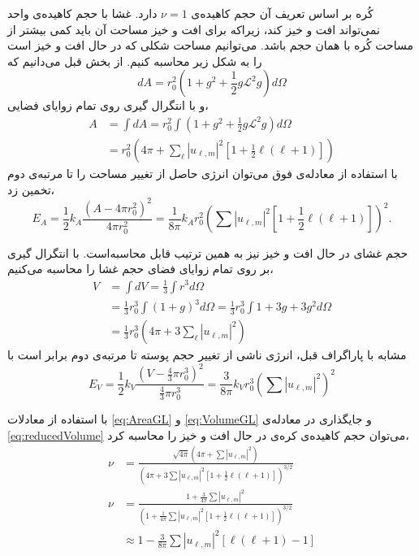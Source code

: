 
 کُره‌ بر اساس تعریف آن حجم کاهیده‌ی 
 $\nu=1$
 دارد. غشا با حجم کاهیده‌ی واحد نمی‌تواند افت و خیز کند، زیراکه برای افت و خیز مساحت آن باید کمی بیشتر از مساحت کُره با همان حجم باشد. می‌توانیم مساحت شکلی که در حال افت و خیز است را به شکل زیر محاسبه کنیم. از بخش قبل می‌دانیم که
\begin{equation}
dA=r_{0}^2(1+g^2+\frac{1}{2}g\mathcal{L}^2g)d\Omega
\label{eq:areaPatchDifferential}
\end{equation}
 و با انتگرال گیری روی تمام زوایای فضایی،
 \begin{equation}
\begin{aligned}
A&=\int dA=r_{0}^2\int(1+g^2+\frac{1}{2}g\mathcal{L}^2g)d\Omega\\
&=r_{0}^2(4\pi+\sum_{\ell}|u_{\ell,m}|^2[1+\frac{1}{2}\ell(\ell+1)])
\label{eq:AreaGL}
\end{aligned}
\end{equation}
با استفاده از معادله‌ی فوق می‌توان انرژی حاصل از تغییر مساحت را تا مرتبه‌ی دوم تخمین زد،
\begin{equation}
E_A=\frac{1}{2}k_A\frac{(A-4\pi r_{0}^2)^2}{4\pi r_{0}^2}=\frac{1}{8\pi}k_A r_{0}^2(\sum|u_{\ell,m}|^2[1+\frac{1}{2}\ell(\ell+1)])^2.
\label{eq:AreaGLFluctuationAmplitude}
\end{equation}


 حجم غشای در حال افت و خیز نیز به همین ترتیب قابل محاسبه‌است. با انتگرال گیری بر روی تمام زوایای فضای حجم غشا را محاسبه می‌کنیم،
\begin{equation}
\begin{aligned}
V&=\int dV=\frac{1}{3}\int r^3d\Omega\\
&=\frac{1}{3}r_{0}^3\int(1+g)^3d\Omega=\frac{1}{3}r_{0}^3\int1+3g+3g^2d\Omega\\
&=\frac{1}{3}r_{0}^3(4\pi+3\sum_{\ell}|u_{\ell,m}|^2)
\label{eq:VolumeGL}
\end{aligned}
\end{equation}
مشابه با پاراگراف قبل، انرژی ناشی از تغییر حجم پوسته تا مرتبه‌ی دوم برابر است با
\begin{equation}
E_V=\frac{1}{2}k_V\frac{(V-\frac{4}{3}\pi r_{0}^3)^2}{\frac{4}{3}\pi r_{0}^3}= \frac{3}{8\pi}k_Vr_{0}^3(\sum|u_{\ell,m}|^2)^2
\label{eq:VolumeGLFluctuationAmplitude}
\end{equation}



با استفاده از معادلات
\ref{eq:AreaGL}
و
\ref{eq:VolumeGL}
و جایگذاری در معادله‌ی
\ref{eq:reducedVolume}
می‌توان حجم کاهیده‌ی کره‌ی در حال افت و خیز  را محاسبه کرد،
\begin{equation}
\begin{aligned}
\nu&=\frac{\sqrt{4\pi}(4\pi+\sum|u_{\ell,m}|^2)}{(4\pi+3\sum|u_{\ell,m}|^2[1+\frac{1}{2}\ell(\ell+1)])^{3/2}}\\
\nu&=\frac{1+\frac{3}{4\pi}\sum|u_{\ell,m}|^2}{(1+\frac{1}{4\pi}\sum|u_{\ell,m}|^2[1+\frac{1}{2}\ell(\ell+1)])^{3/2}}\\
&\approx 1-\frac{3}{8\pi}\sum|u_{\ell,m}|^2[\ell(\ell+1)-1]
\label{eq:nuUndulated}
\end{aligned}
\end{equation}
